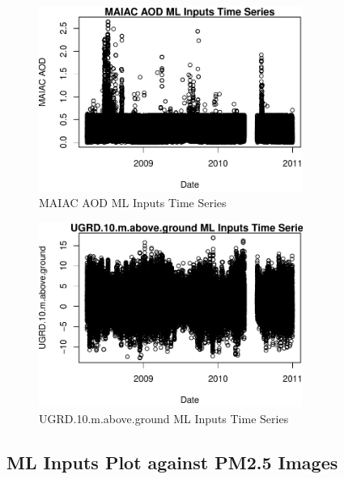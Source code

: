 \begin{figure} 
\centering  
\includegraphics[width=0.77\textwidth]{Code_Outputs/ML_input_report_ML_input_PM25_Step5_part_d_de_duplicated_aves_ML_inputpdfs_MAIAC_AODvDate.pdf} 
\caption{\label{fig:ML_input_report_ML_input_PM25_Step5_part_d_de_duplicated_aves_ML_inputpdfsMAIAC_AODvDate}MAIAC AOD ML Inputs Time Series} 
\end{figure} 
 

\begin{figure} 
\centering  
\includegraphics[width=0.77\textwidth]{Code_Outputs/ML_input_report_ML_input_PM25_Step5_part_d_de_duplicated_aves_ML_inputpdfs_UGRD10mabovegroundvDate.pdf} 
\caption{\label{fig:ML_input_report_ML_input_PM25_Step5_part_d_de_duplicated_aves_ML_inputpdfsUGRD10mabovegroundvDate}UGRD.10.m.above.ground ML Inputs Time Series} 
\end{figure} 
 

\subsection{ML Inputs Plot against PM2.5 Images} 
 

